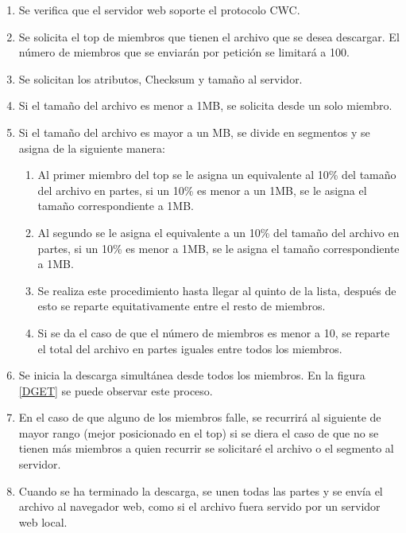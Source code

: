 \begin{enumerate}
\item Se verifica que el servidor web soporte el protocolo CWC.
\item Se solicita el top de miembros que tienen el archivo que se desea descargar. El número de miembros que se enviarán por petición se limitará a 100.
\item Se solicitan los atributos, Checksum y tamaño al servidor.
\item Si el tamaño del archivo es menor a 1MB, se solicita desde un solo miembro.
\item Si el tamaño del archivo es mayor a un MB, se divide en segmentos y se asigna de la siguiente manera:

	\begin{enumerate}
	\item Al primer miembro del top se le asigna un equivalente al 10\% del tamaño del archivo en partes, si un 10\% es menor a un 1MB, se le asigna el tamaño correspondiente a 1MB.
	\item Al segundo se le asigna el equivalente a un 10\% del tamaño del archivo en partes, si un 10\% es menor a 1MB, se le asigna el tamaño correspondiente a 1MB. 
	\item Se realiza este procedimiento hasta llegar al quinto de la lista, después de esto se reparte equitativamente entre el resto de miembros.
	\item Si se da el caso de que el número de miembros es menor a 10, se reparte el total del archivo en partes iguales entre todos los miembros. 
	\end{enumerate}

\item Se inicia la descarga simultánea desde todos los miembros. En la figura \ref{DGET} se puede observar este proceso.

\item En el caso de que alguno de los miembros falle, se recurrirá al siguiente de mayor rango (mejor posicionado en el top) si se diera el caso de que no se tienen más miembros a quien recurrir se solicitaré el archivo o el segmento al servidor.

\item Cuando se ha terminado la descarga, se unen todas las partes y se envía el archivo al navegador web, como si el archivo fuera servido por un servidor web local.

\end{enumerate}


